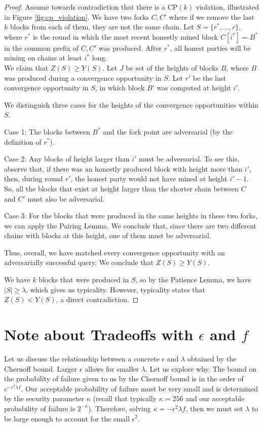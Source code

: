 \begin{proof}
Assume towards contradiction that there is a CP$(k)$ violation, illustrated in Figure \ref{fig:cp_violation}.
We have two forks $C, C'$ where if we remove the last $k$ blocks from each of them, they are not the same chain. Let $S = \{ r^*, ..., r\}$, where $r^*$ is the round in which the most recent honestly mined block $C[i^*] = B^*$ in the common prefix of $C, C'$ was produced. After $r^*$, all honest parties will be mining on chains at least $i^*$ long. \\

We claim that $Z(S) \geq Y(S)$. Let $J$ be set of the heights of blocks $B$, where $B$ was produced during a convergence opportunity in $S$. Let $r'$ be the last convergence opportunity in $S$, in which block $B'$ was computed at height $i'$.

We distinguish three cases for the heights of the convergence opportunities within $S$.

Case 1: The blocks between $B^*$ and the fork point are adversarial (by the definition of $r^*$).

Case 2: Any blocks of height larger than $i'$ must be adversarial. To see this, observe that, if there was an honestly produced block with height more than $i'$, then, during round $r'$, the honest party would not have mined at height $i' - 1$. So, all the blocks that exist at height larger than the shorter chain between $C$ and $C'$ must also be adversarial.

Case 3: For the blocks that were produced in the same heights in these two forks, we can apply the Pairing Lemma. We conclude that, since there are two different chains with blocks at this height, one of them must be adversarial.

Thus, overall, we have matched every convergence opportunity with an adversarially successful query. We conclude that $Z(S) \geq Y(S)$.

We have $k$ blocks that were produced in $S$, so by the Patience Lemma, we have $|S| \geq \lambda$, which gives us typicality. However, typicality states that $Z(S) < Y(S)$, a direct contradiction.
\end{proof}




\section{Note about Tradeoffs with $\epsilon$ and $f$}

Let us discuss the relationship between a concrete $\epsilon$ and $\lambda$ obtained by the Chernoff bound.
Larger $\epsilon$ allows for smaller $\lambda$. Let us explore why. The bound on the probability of failure given to us by the Chernoff bound is in the order of $e^{-\epsilon^2 \lambda f}$. Our acceptable probability of failure must be very small and is determined by the security parameter $\kappa$ (recall that typically $\kappa = 256$ and our acceptable probability of failure is $2^{-\kappa}$). Therefore, solving $\kappa = -\epsilon^2 \lambda f$, then we must set $\lambda$ to be large enough to account for the small $\epsilon^2$.


